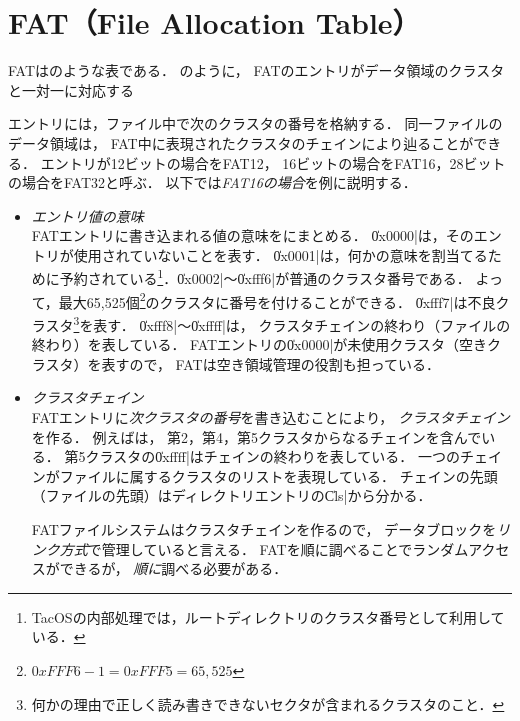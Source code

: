 \section{FAT（File Allocation Table）}
FATはのような表である．
のように，
FATのエントリがデータ領域のクラスタと一対一に対応する

エントリには，ファイル中で次のクラスタの番号を格納する．
同一ファイルのデータ領域は，
FAT中に表現されたクラスタのチェインにより辿ることができる．
エントリが12ビットの場合をFAT12，
16ビットの場合をFAT16，28ビットの場合をFAT32と呼ぶ．
以下では\emph{FAT16の場合}を例に説明する．

\begin{itemize}
\item \emph{エントリ値の意味} \\
  FATエントリに書き込まれる値の意味をにまとめる．
  \|0x0000|は，そのエントリが使用されていないことを表す．
  \|0x0001|は，何かの意味を割当てるために予約されている\footnote{
    TacOSの内部処理では，ルートディレクトリのクラスタ番号として利用している．
  }．\|0x0002|〜\|0xfff6|が普通のクラスタ番号である．
  よって，最大65,525個\footnote{
    $0xFFF6 - 1 = 0xFFF5 = 65,525$
  }のクラスタに番号を付けることができる．
  \|0xfff7|は不良クラスタ\footnote{
    何かの理由で正しく読み書きできないセクタが含まれるクラスタのこと．
  }を表す．
  \|0xfff8|〜\|0xffff|は，
  クラスタチェインの終わり（ファイルの終わり）を表している．
  FATエントリの\|0x0000|が未使用クラスタ（空きクラスタ）を表すので，
  FATは空き領域管理の役割も担っている．

\item \emph{クラスタチェイン} \\
  FATエントリに\emph{次クラスタの番号}を書き込むことにより，
  \emph{クラスタチェイン}を作る．
  例えばは，
  第2，第4，第5クラスタからなるチェインを含んでいる．
  第5クラスタの\|0xffff|はチェインの終わりを表している．
  一つのチェインがファイルに属するクラスタのリストを表現している．
  チェインの先頭（ファイルの先頭）はディレクトリエントリの\|Cls|から分かる．

  FATファイルシステムはクラスタチェインを作るので，
  データブロックを\emph{リンク方式}で管理していると言える．
  FATを順に調べることでランダムアクセスができるが，
  \emph{順に}調べる必要がある．

\end{itemize}


